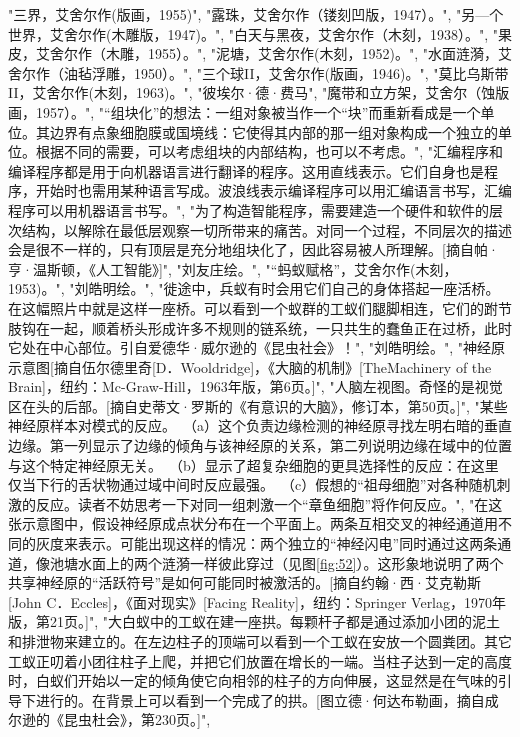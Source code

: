 "\label {fig:46}三界，艾舍尔作(版画，1955)",
"\label {fig:47}露珠，艾舍尔作（镂刻凹版，1947）。",
"\label {fig:48}另—个世界，艾舍尔作(木雕版，1947)。",
"\label {fig:49}白天与黑夜，艾舍尔作（木刻，1938）。",
"\label {fig:50}果皮，艾舍尔作（木雕，1955）。",
"\label {fig:51}泥塘，艾舍尔作(木刻，1952)。",
"\label {fig:52}水面涟漪，艾舍尔作（油毡浮雕，1950）。",
"\label {fig:53}三个球II，艾舍尔作(版画，1946)。",
"莫比乌斯带II，艾舍尔作(木刻，1963)。",
"彼埃尔·德·费马",
"魔带和立方架，艾舍尔（蚀版画，1957）。",
"“组块化”的想法：一组对象被当作一个“块”而重新看成是一个单位。其边界有点象细胞膜或国境线：它使得其内部的那一组对象构成一个独立的单位。根据不同的需要，可以考虑组块的内部结构，也可以不考虑。",
"汇编程序和编译程序都是用于向机器语言进行翻译的程序。这用直线表示。它们自身也是程序，开始时也需用某种语言写成。波浪线表示编译程序可以用汇编语言书写，汇编程序可以用机器语言书写。",
"为了构造智能程序，需要建造一个硬件和软件的层次结构，以解除在最低层观察一切所带来的痛苦。对同一个过程，不同层次的描述会是很不一样的，只有顶层是充分地组块化了，因此容易被人所理解。[摘自帕·亨·温斯顿，《人工智能》]",
"\label {fig:60}刘友庄绘。",
"“蚂蚁赋格”，艾舍尔作(木刻，1953)。",
"刘皓明绘。",
"徙途中，兵蚁有时会用它们自己的身体搭起一座活桥。在这幅照片中就是这样一座桥。可以看到一个蚁群的工蚁们腿脚相连，它们的跗节肢钩在一起，顺着桥头形成许多不规则的链系统，一只共生的蠢鱼正在过桥，此时它处在中心部位。引自爱德华·威尔逊的《昆虫社会》！",
"刘皓明绘。",
"神经原示意图[摘自伍尔德里奇[D．Wooldridge]，《大脑的机制》[TheMachinery of the Brain]，纽约：Mc-Graw-Hill，1963年版，第6页。]",
"人脑左视图。奇怪的是视觉区在头的后部。[摘自史蒂文·罗斯的《有意识的大脑》，修订本，第50页。]",
"某些神经原样本对模式的反应。\protect \ （a）这个负责边缘检测的神经原寻找左明右暗的垂直边缘。第一列显示了边缘的倾角与该神经原的关系，第二列说明边缘在域中的位置与这个特定神经原无关。\protect \ （b）显示了超复杂细胞的更具选择性的反应：在这里仅当下行的舌状物通过域中间时反应最强。\protect \ （c）假想的“祖母细胞”对各种随机刺激的反应。读者不妨思考一下对同一组刺激一个“章鱼细胞”将作何反应。",
"在这张示意图中，假设神经原成点状分布在一个平面上。两条互相交叉的神经通道用不同的灰度来表示。可能出现这样的情况：两个独立的“神经闪电”同时通过这两条通道，像池塘水面上的两个涟漪一样彼此穿过（见图\ref {fig:52}）。这形象地说明了两个共享神经原的“活跃符号”是如何可能同时被激活的。[摘自约翰·西·艾克勒斯[John C．Eccles]，《面对现实》[Facing Reality]，纽约：Springer Verlag，1970年版，第21页。]",
"大白蚁中的工蚁在建一座拱。每颗杆子都是通过添加小团的泥土和排泄物来建立的。在左边柱子的顶端可以看到一个工蚁在安放一个圆粪团。其它工蚁正叨着小团往柱子上爬，并把它们放置在增长的一端。当柱子达到一定的高度时，白蚁们开始以一定的倾角使它向相邻的柱子的方向伸展，这显然是在气味的引导下进行的。在背景上可以看到一个完成了的拱。[图立德·何达布勒画，摘自成尔逊的《昆虫杜会》，第230页。]",
